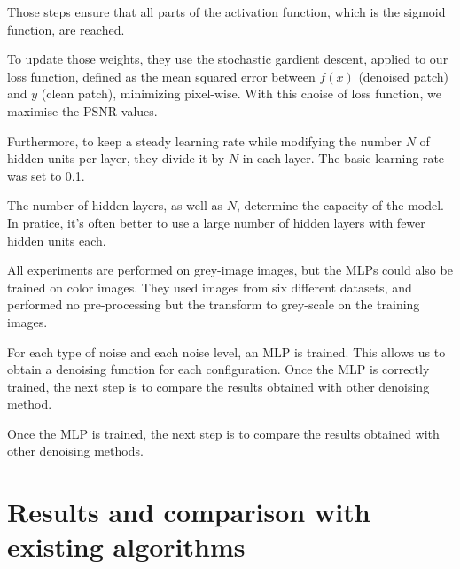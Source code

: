 \documentclass[10pt,a4paper]{article}
\newcommand{\svs}{\vspace{9pt}}
\begin{document}
Those steps ensure that all parts of the activation function, which is the sigmoid function, are reached.

To update those weights, they use the stochastic gardient descent, applied to our loss function, defined as the mean squared error between $f(x)$ (denoised patch) and $y$ (clean patch), minimizing pixel-wise. With this choise of loss function, we maximise the PSNR values. %



\svs

Furthermore, to keep a steady learning rate while modifying the number $N$ of hidden units per layer, they divide it by $N$ in each layer. The basic learning rate was set to 0.1. 

\svs

The number of hidden layers, as well as $N$, determine the capacity of the model. In pratice, it's often better to use a large number of hidden layers with fewer hidden units each.

\svs

All experiments are performed on grey-image images, but the MLPs could also be trained on color images. They used images from six different datasets, and performed no pre-processing but the transform to grey-scale on the training images. 

\svs 

For each type of noise and each noise level, an MLP is trained. This allows us to obtain a
denoising function for each configuration.
Once the MLP is correctly trained, the next step is to compare the results obtained with other
denoising method.

Once the MLP is trained, the next step is to compare the results obtained with other denoising methods.





\svs

\section{Results and comparison with existing algorithms}
\end{document}
